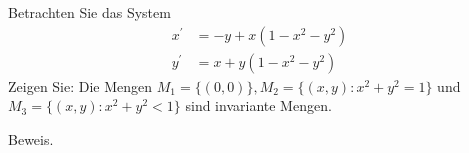 \begin{exercise}
Betrachten Sie das System
\begin{align*}
  x^{\prime} &= -y + x(1 - x^2 - y^2) \\
  y^{\prime} &= x + y(1 - x^2 - y^2)
\end{align*}
Zeigen Sie: Die Mengen $M_1 = \{(0,0)\}, M_2 = \{(x,y): x^2 + y^2 = 1\}$
und $M_3 = \{(x,y): x^2 + y^2 < 1\}$ sind invariante Mengen.
\end{exercise}
\begin{solution}
Beweis.
\end{solution}
